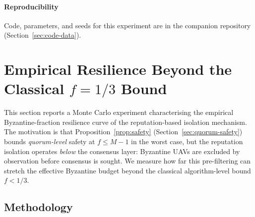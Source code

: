 \documentclass[journal,10pt,twocolumn]{IEEEtran}
\begin{document}
\paragraph{Reproducibility}
Code, parameters, and seeds for this experiment are in the
companion repository (Section~\ref{sec:code-data}).


\section{Empirical Resilience Beyond the Classical \texorpdfstring{$f{=}1/3$}{f=1/3} Bound}
\label{sec:byzantine-scaling-empirical}

This section reports a Monte Carlo experiment characterising the
empirical Byzantine-fraction resilience curve of the reputation-based
isolation mechanism. The motivation is that
Proposition~\ref{prop:safety} (Section~\ref{sec:quorum-safety}) bounds
\emph{quorum-level} safety at $f \leq M-1$ in the worst case, but the
reputation isolation operates \emph{below} the consensus layer:
Byzantine UAVs are excluded by observation before consensus is sought.
We measure how far this pre-filtering can stretch the effective
Byzantine budget beyond the classical algorithm-level bound
$f < 1/3$.

\subsection{Methodology}
\end{document}
